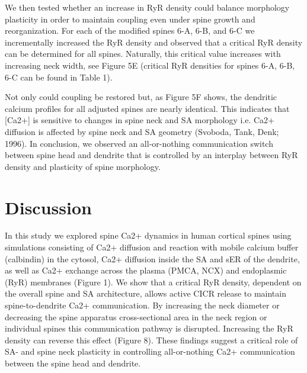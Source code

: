 \documentclass[fleqn,12pt]{wlscirep}
\begin{document}
		We then tested whether an increase in RyR density could balance morphology plasticity in order to maintain coupling even under spine growth and reorganization. For each of the modified spines 6-A, 6-B, and 6-C we incrementally increased the RyR density and observed that a critical RyR density can be determined for all spines. Naturally, this critical value increases with increasing neck width, see Figure 5E (critical RyR densities for spines 6-A, 6-B, 6-C can be found in Table 1). 
		
		Not only could coupling be restored but, as Figure 5F shows, the dendritic calcium profiles for all adjusted spines are nearly identical. This indicates that [Ca2+] is sensitive to changes in spine neck and SA morphology i.e. Ca2+ diffusion is affected by spine neck and SA geometry (Svoboda, Tank, Denk; 1996). In conclusion, we observed an all-or-nothing communication switch between spine head and dendrite that is controlled by an interplay between RyR density and plasticity of spine morphology. 


\section*{Discussion}

In this study we explored spine Ca2+ dynamics in human cortical spines using simulations consisting of Ca2+ diffusion and reaction with mobile calcium buffer (calbindin) in the cytosol, Ca2+ diffusion inside the SA and sER of the dendrite, as well as Ca2+ exchange across the plasma (PMCA, NCX) and endoplasmic (RyR) membranes (Figure 1). We show that a critical RyR density, dependent on the overall spine and SA architecture, allows active CICR release to maintain spine-to-dendrite Ca2+ communication. By increasing the neck diameter or decreasing the spine apparatus cross-sectional area in the neck region or individual spines this communication pathway is disrupted. Increasing the RyR density can reverse this effect (Figure 8). These findings suggest a critical role of SA- and spine neck plasticity in controlling all-or-nothing Ca2+ communication between the spine head and dendrite.
\end{document}
